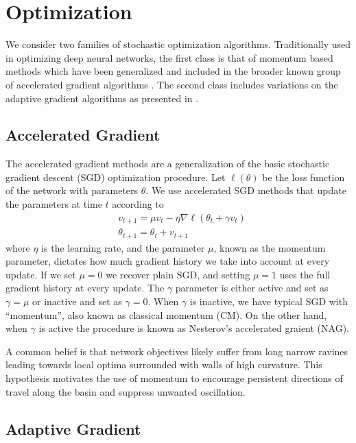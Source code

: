 \section{Optimization}

We consider two families of stochastic optimization algorithms. Traditionally
used in optimizing deep neural networks, the first class is that of momentum
based methods which have been generalized and included in the broader known
group of accelerated gradient algorithms \cite{sutskever_2013}. The second
class includes variations on the adaptive gradient algorithms as presented in
\cite{duchi_2011}.

\subsection{Accelerated Gradient}

The accelerated gradient methods are a generalization of the basic stochastic
gradient descent (SGD) optimization procedure. Let $\ell(\theta)$ be the loss
function of the network with parameters $\theta$. We use accelerated SGD
methods that update the parameters at time $t$ according to
\begin{equation}
\label{nag}
\begin{aligned}
&v_{t+1} = \mu v_t - \eta \nabla \ell (\theta_t + \gamma v_t) \\
&\theta_{t+1} = \theta_t + v_{t+1}
\end{aligned}
\end{equation}
where $\eta$ is the learning rate, and the parameter $\mu$, known as the
momentum parameter, dictates how much gradient history we take into account at
every update. If we set $\mu = 0$ we recover plain SGD, and setting $\mu = 1$
uses the full gradient history at every update.  The $\gamma$ parameter is
either active and set as $\gamma = \mu$ or inactive and set as $\gamma = 0$.
When $\gamma$ is inactive, we have typical SGD with ``momentum'', also known as
classical momentum (CM). On the other hand, when $\gamma$ is active the
procedure is known as Nesterov's accelerated graient (NAG).

A common belief is that network objectives likely suffer from long narrow
ravines leading towards local optima surrounded with walls of high curvature.
This hypothesis motivates the use of momentum to encourage persistent
directions of travel along the basin and suppress unwanted oscillation.

\subsection{Adaptive Gradient}
\label{adagrad}

